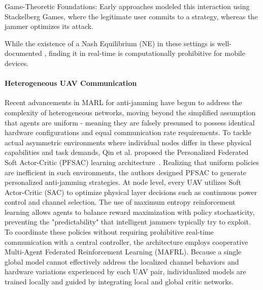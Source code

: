 \documentclass[conference]{IEEEtran}
\newcommand{\adm}[1]{{\color{orange}{[#1]}}}
\begin{document}
Game-Theoretic Foundations:
Early approaches modeled this interaction using Stackelberg Games, where the legitimate user commits to a strategy, whereas the jammer optimizes its attack. 

While the existence of a Nash Equilibrium (NE) in these settings is well-documented 
, finding it in real-time is computationally prohibitive for mobile devices. 

\paragraph{Heterogeneous UAV Communication} 
Recent advancements in MARL for anti-jamming have begun to address the complexity of heterogeneous networks, moving beyond the simplified assumption that agents are uniform - meaning they are falsely presumed to possess identical hardware configurations and equal communication rate requirements.
To tackle actual asymmetric environments where individual nodes differ in these physical capabilities and task demands, Qin et al. proposed the Personalized Federated Soft Actor-Critic (PFSAC) learning architecture~.
Realizing that uniform policies are inefficient in such environments, the authors designed PFSAC to generate personalized anti-jamming strategies.
%
At node level, every UAV utilizes Soft Actor-Critic (SAC) to optimize physical layer decisions such as continuous power control and channel selection. 
The use of maximum entropy reinforcement learning allows agents to balance reward maximization with policy stochasticity, preventing the "predictability" that intelligent jammers typically try to exploit.
To coordinate these policies without requiring prohibitive real-time communication with a central controller, the architecture employs cooperative Multi-Agent Federated Reinforcement Learning (MAFRL). 
Because a single global model cannot effectively address the localized channel behaviors and hardware variations experienced by each UAV pair, individualized models are trained locally and guided by integrating local and global critic networks.
\end{document}
